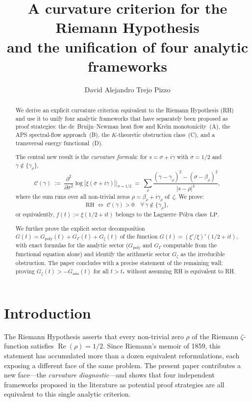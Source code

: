 \documentclass[11pt]{amsart}
\title[A Curvature Criterion for RH]{A curvature criterion for the Riemann Hypothesis\\
  and the unification of four analytic frameworks}
\author{David Alejandro Trejo Pizzo}
\renewcommand{\Re}{\operatorname{Re}}
\newcommand{\LP}{\mathrm{LP}}
\begin{document}
\begin{abstract}
We derive an explicit curvature criterion equivalent to the Riemann Hypothesis (RH) and
use it to unify four analytic frameworks that have separately been proposed as proof
strategies: the de~Bruijn--Newman heat flow and Kre\u{\i}n monotonicity~(A), the
APS spectral-flow approach~(B), the $K$-theoretic obstruction class~(C), and a
transversal energy functional~(D).

The central new result is the \emph{curvature formula}: for $s = \sigma + i\gamma$
with $\sigma = 1/2$ and $\gamma \notin \{\gamma_\rho\}$,
\[
  \mathcal{C}(\gamma)
  \;:=\;
  \frac{\partial^2}{\partial\sigma^2}\log|\xi(\sigma+i\gamma)|
  \bigg|_{\sigma=1/2}
  \;=\;
  \sum_\rho \frac{(\gamma-\gamma_\rho)^2 - (\sigma - \beta_\rho)^2}{|s-\rho|^4},
\]
where the sum runs over all non-trivial zeros $\rho = \beta_\rho + i\gamma_\rho$ of~$\zeta$.
We prove:
\[
  \mathrm{RH}
  \;\iff\;
  \mathcal{C}(\gamma) > 0 \quad \forall\,\gamma \notin \{\gamma_\rho\},
\]
or equivalently, $f(t) := \xi(1/2+it)$ belongs to the Laguerre--P\'olya class~$\LP$.

We further prove the explicit sector decomposition
$G(t) = G_{\mathrm{poly}}(t) + G_\Gamma(t) + G_\zeta(t)$ of the function
$G(t) = (\xi'/\xi)'(1/2+it)$, with exact formulas for the analytic sector
($G_{\mathrm{poly}}$ and $G_\Gamma$ computable from the functional equation alone)
and identify the arithmetic sector $G_\zeta$ as the irreducible obstruction.
The paper concludes with a precise statement of the remaining wall: proving
$G_\zeta(t) > -G_{\mathrm{ana}}(t)$ for all $t > t_*$ without assuming RH
is equivalent to RH.
\end{abstract}

\maketitle

\tableofcontents
\newpage

\section{Introduction}
\label{sec:intro}

The Riemann Hypothesis asserts that every non-trivial zero $\rho$ of the Riemann
$\zeta$-function satisfies $\Re(\rho) = 1/2$.
Since Riemann's memoir of 1859, this statement has accumulated more than a dozen
equivalent reformulations, each exposing a different face of the same problem.
The present paper contributes a new face---the \emph{curvature diagnostic}---and
shows that four independent frameworks proposed in the literature
as potential proof strategies are all equivalent to this single analytic criterion.
\end{document}
